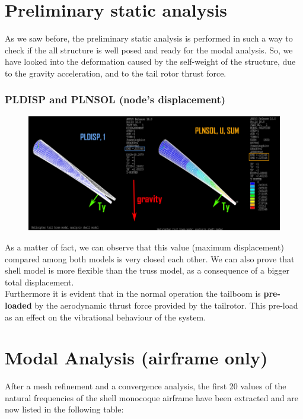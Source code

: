 \section{Preliminary static analysis}
\noindent
As we saw before, the preliminary static analysis is performed in such a way to check if the all structure is well posed and ready for the modal analysis.
So, we have looked into the deformation caused by the self-weight of the structure, due to the gravity acceleration, and to the tail rotor thrust force. 



\subsubsection*{PLDISP and PLNSOL (node's displacement)}
\begin{figure}[h!]
	\begin{center}
		\centering  		 		
		\includegraphics[width=0.95\linewidth]{PICTURES/3_Ecureuil/static_analysis_simple.png}
	\end{center}
\end{figure}	

\noindent As a matter of fact, we can observe that this value (maximum displacement) 
compared among both models is very closed each other. We can also prove that shell model is more flexible than the truss model, as a consequence of a bigger total displacement.\\
Furthermore it is evident that in the normal operation the tailboom is \textbf{pre-loaded} by the aerodynamic thrust force provided by the tailrotor. This pre-load as an effect on the vibrational behaviour of the system. 



\clearpage
\section*{Modal Analysis (airframe only)}
\noindent
After a mesh refinement and a convergence analysis, the first 20 values of the natural frequencies of the shell monocoque airframe have been extracted and are now listed in the following table:

